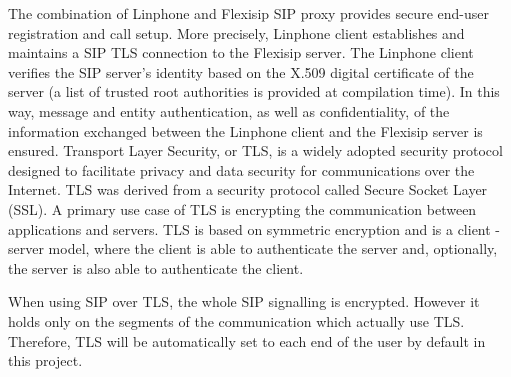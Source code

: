     \noindent The combination of Linphone and Flexisip SIP proxy provides secure end-user registration and call setup.
    More precisely, Linphone client establishes and maintains a SIP TLS connection to the Flexisip server. 
    The Linphone client verifies the SIP server’s identity based on the X.509 digital certificate of the server (a list of trusted root authorities is provided at compilation time). 
    In this way, message and entity authentication, as well as confidentiality, of the information exchanged between the Linphone client and the Flexisip server is ensured. 
    Transport Layer Security, or TLS, is a widely adopted security protocol designed to facilitate privacy and data security for communications over the Internet. 
    TLS was derived from a security protocol called Secure Socket Layer (SSL). A primary use case of TLS is encrypting the communication between applications and servers. 
    TLS is based on symmetric encryption and is a client - server model, where the client is able to authenticate the server and, optionally, the server is also able to authenticate the client. 

    \noindent When using SIP over TLS, the whole SIP signalling is encrypted. However it holds only on the segments of the communication which actually use TLS. 
    Therefore, TLS will be automatically set to each end of the user by default in this project. 

